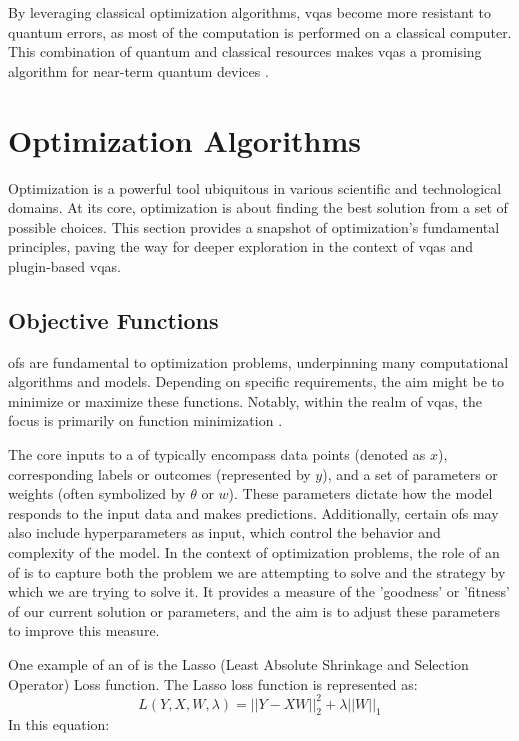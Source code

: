 \documentclass[
  a4paper,  %
  twoside,  %
  bibliography=totoc,
  headsepline,
  cleardoublepage=empty,
  parskip=half,
  draft=false
]{scrbook}
\begin{document}
By leveraging classical optimization algorithms, \glspl{vqa} become more resistant to quantum errors, as most of the computation is performed on a classical computer.
This combination of quantum and classical resources makes \glspl{vqa} a promising algorithm for near-term quantum devices \cite{Moll2017}.


\section{Optimization Algorithms}
\label{sec:optimizationAlgorithms}
Optimization is a powerful tool ubiquitous in various scientific and technological domains.
At its core, optimization is about finding the best solution from a set of possible choices.
This section provides a snapshot of optimization's fundamental principles, paving the way for deeper exploration in the context of \glspl{vqa} and plugin-based \glspl{vqa}.

\subsection{Objective Functions}
\label{subsec:objectiveFunctions}
\glspl{of} are fundamental to optimization problems, underpinning many computational algorithms and models.
Depending on specific requirements, the aim might be to minimize or maximize these functions.
Notably, within the realm of \glspl{vqa}, the focus is primarily on function minimization \cite{Weinan2017}.

The core inputs to a \gls{of} typically encompass data points (denoted as $x$), corresponding labels or outcomes (represented by $y$), and a set of parameters or weights (often symbolized by $\theta$ or $w$).
These parameters dictate how the model responds to the input data and makes predictions.
Additionally, certain \glspl{of} may also include hyperparameters as input, which control the behavior and complexity of the model.
In the context of optimization problems, the role of an \gls{of} is to capture both the problem we are attempting to solve and the strategy by which we are trying to solve it.
It provides a measure of the 'goodness' or 'fitness' of our current solution or parameters, and the aim is to adjust these parameters to improve this measure.

One example of an \gls{of} is the Lasso (Least Absolute Shrinkage and Selection Operator) Loss function.
The Lasso loss function is represented as:
\[
L(Y, X, W, \lambda) = ||Y - XW||^2_2 + \lambda ||W||_1
\]
In this equation:
\end{document}
